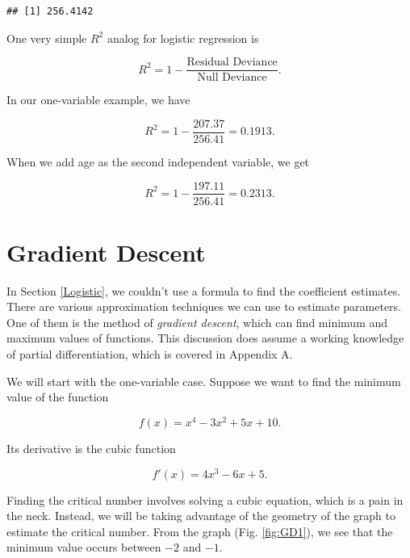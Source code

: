 \documentclass[
]{book}
\theoremstyle{definition}
\theoremstyle{definition}
\theoremstyle{definition}
\theoremstyle{definition}
\theoremstyle{remark}
\begin{document}
\begin{verbatim}
## [1] 256.4142
\end{verbatim}

One very simple \(R^2\) analog for logistic regression is

\begin{equation}R^2=1-\frac{\text{Residual Deviance}}{\text{Null Deviance}}.
\label{eq:R2log}
\end{equation}

In our one-variable example, we have

\[R^2=1-\frac{207.37}{256.41}=0.1913.\]

When we add age as the second independent variable, we get

\[R^2=1-\frac{197.11}{256.41}=0.2313.\]

\section{Gradient Descent}\label{GDA}

In Section \ref{Logistic}, we couldn't use a formula to find the coefficient estimates. There are various approximation techniques we can use to estimate parameters. One of them is the method of \emph{gradient descent}, which can find minimum and maximum values of functions. This discussion does assume a working knowledge of partial differentiation, which is covered in Appendix A.

We will start with the one-variable case. Suppose we want to find the minimum value of the function

\[f(x)=x^4-3x^2+5x+10.\]

Its derivative is the cubic function

\[f'(x)=4x^3-6x+5.\]

Finding the critical number involves solving a cubic equation, which is a pain in the neck. Instead, we will be taking advantage of the geometry of the graph to estimate the critical number. From the graph (Fig. \ref{fig:GD1}), we see that the minimum value occurs between \(-2\) and \(-1.\)
\end{document}
